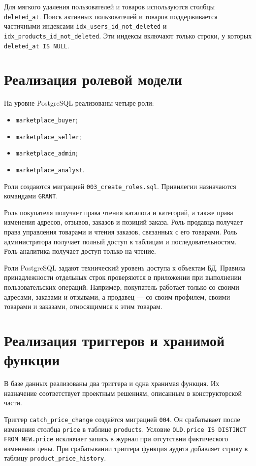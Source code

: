 Для мягкого удаления пользователей и товаров используются столбцы \texttt{deleted\_at}. Поиск активных пользователей и товаров поддерживается частичными индексами \texttt{idx\_users\_id\_not\_deleted} и \texttt{idx\_products\_id\_not\_deleted}. Эти индексы включают только строки, у которых \texttt{deleted\_at IS NULL}.

\section{Реализация ролевой модели}

На уровне PostgreSQL реализованы четыре роли:

\begin{itemize}
    \item \texttt{marketplace\_buyer};
    \item \texttt{marketplace\_seller};
    \item \texttt{marketplace\_admin};
    \item \texttt{marketplace\_analyst}.
\end{itemize}

Роли создаются миграцией \texttt{003\_create\_roles.sql}. Привилегии назначаются командами \texttt{GRANT}.

Роль покупателя получает права чтения каталога и категорий, а также права изменения адресов, отзывов, заказов и позиций заказа. Роль продавца получает права управления товарами и чтения заказов, связанных с его товарами. Роль администратора получает полный доступ к таблицам и последовательностям. Роль аналитика получает доступ только на чтение.

Роли PostgreSQL задают технический уровень доступа к объектам БД. Правила принадлежности отдельных строк проверяются в приложении при выполнении пользовательских операций. Например, покупатель работает только со своими адресами, заказами и отзывами, а продавец --- со своим профилем, своими товарами и заказами, относящимися к этим товарам.

\section{Реализация триггеров и хранимой функции}

В базе данных реализованы два триггера и одна хранимая функция. Их назначение соответствует проектным решениям, описанным в конструкторской части.

Триггер \texttt{catch\_price\_change} создаётся миграцией \texttt{004}. Он срабатывает после изменения столбца \texttt{price} в таблице \texttt{products}. Условие \texttt{OLD.price IS DISTINCT FROM NEW.price} исключает запись в журнал при отсутствии фактического изменения цены. При срабатывании триггера функция аудита добавляет строку в таблицу \texttt{product\_price\_history}.

